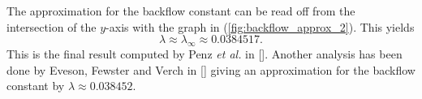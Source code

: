 	The approximation for the backflow constant can be read off from the intersection of the $y$-axis with the graph in (\ref{fig:backflow_approx_2}). This yields
	\begin{equation}
		\lambda\approx\lambda_\infty\approx 0.0384517.
	\end{equation}
	This is the final result computed by Penz \textit{et al.} in [\citealp{penz}]. Another analysis has been done by Eveson, Fewster and Verch in [\citealp{verch}] giving an approximation for the backflow constant by $\lambda\approx 0.038452$.\\
	
	
	
	

